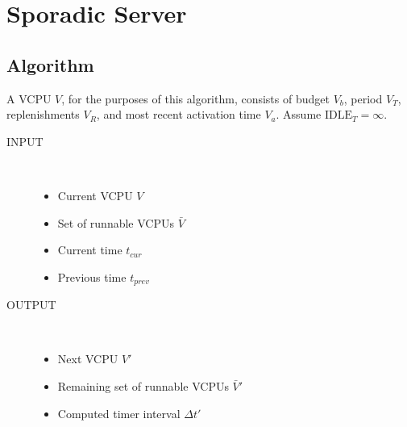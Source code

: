\documentclass{article}
\begin{document}
\newpage
\section{Sporadic Server}
\subsection{Algorithm}


A VCPU $V$, for the purposes of this algorithm, consists of budget
$V_b$, period $V_T$, replenishments $V_R$, and most recent activation
time $V_a$.  Assume $\text{IDLE}_T=\infty$.

\begin{description}
\item[INPUT] ~
  \begin{itemize}
  \item Current VCPU $V$
  \item Set of runnable VCPUs $\bar V$
  \item Current time $t_{cur}$
  \item Previous time $t_{prev}$
  \end{itemize}
\item[OUTPUT] ~
  \begin{itemize}
  \item Next VCPU $V'$
  \item Remaining set of runnable VCPUs $\bar V'$
  \item Computed timer interval $\Delta t'$
  \end{itemize}
\end{description}
\end{document}
